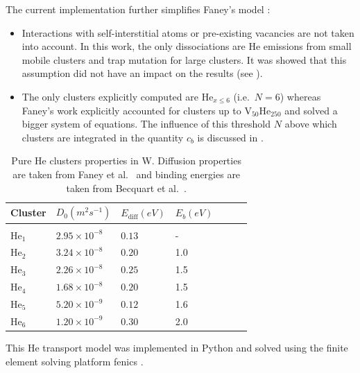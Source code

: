 The current implementation further simplifies Faney's model :
\begin{itemize}
    \item Interactions with \gls{self-interstitial} atoms or pre-existing vacancies are not taken into account.
    In this work, the only dissociations are He emissions from small mobile clusters and \gls{trap mutation} for large clusters.
    It was showed that this assumption did not have an impact on the results (see ).
    \item The only clusters explicitly computed are $\mathrm{He}_{x \leq 6}$ (i.e.\ $N=6$) whereas Faney's work explicitly accounted for clusters up to $\mathrm{V}_{50}\mathrm{He}_{250}$ and solved a bigger system of equations.
    The influence of this threshold $N$ above which clusters are integrated in the quantity $c_b$ is discussed in .
\end{itemize}

\begin{table}
    \centering
    \begin{tabular}{L{1cm} R{2cm} R{1.6cm} R{1.1cm} R{1.6cm} R{1.1cm} R{2cm}}
        Cluster & $D_0 (\si{m^2 s^{-1}})$  & $E_\mathrm{diff} (\si{eV})$ &  $E_b (\si{eV})$   \\
        \hline
        \\
        He$_1$ & $2.95\times 10^{-8}$ & $0.13$ & - \\
        He$_2$ & $3.24\times 10^{-8}$ & $0.20$ & 1.0\\
        He$_3$ & $2.26\times 10^{-8}$ & $0.25$ & 1.5\\
        He$_4$ & $1.68\times 10^{-8}$ & $0.20$ & 1.5\\
        He$_5$ & $5.20\times 10^{-9}$ & $0.12$ & 1.6\\
        He$_6$ & $1.20\times 10^{-9}$ & $0.30$ & 2.0\\
    \end{tabular}
    \caption{Pure \gls{He} clusters properties in \gls{W}. Diffusion properties are taken from Faney et al.\ \cite{faney_spatially_2015} and binding energies are taken from Becquart et al.\ \cite{becquart_microstructural_2010}.}
\end{table}



This \gls{He} transport model was implemented in Python and solved using the finite element solving platform \gls{fenics} .

